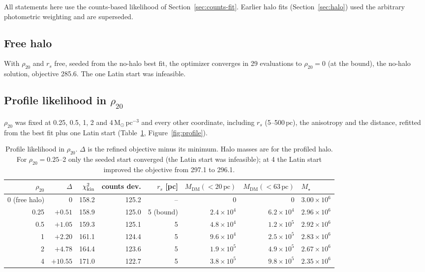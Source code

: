 \documentclass[11pt,a4paper]{article}
\newcommand{\Msun}{\ensuremath{\mathrm{M}_\odot}\xspace}
\newcommand{\pc}{\ensuremath{\,\mathrm{pc}}\xspace}
\newcommand{\dm}{\mathrm{DM}}
\newcommand{\chikin}{\ensuremath{\chi^2_{\rm kin}}\xspace}
\begin{document}
All statements here use the counts-based likelihood of
Section~\ref{sec:counts-fit}. Earlier halo fits (Section~\ref{sec:halo}) used
the arbitrary photometric weighting and are superseded.

\subsection{Free halo}
With $\rho_{20}$ and $r_s$ free, seeded from the no-halo best fit, the
optimizer converges in 29 evaluations to $\rho_{20}=0$ (at the bound), the
no-halo solution, objective 285.6. The one Latin start was infeasible.

\subsection{Profile likelihood in $\rho_{20}$}
\label{sec:profile}

$\rho_{20}$ was fixed at 0.25, 0.5, 1, 2 and 4\,$\Msun\pc^{-3}$ and every
other coordinate, including $r_s$ (5--500\pc), the anisotropy and the
distance, refitted from the best fit plus one Latin start
(Table~\ref{tab:profile}, Figure~\ref{fig:profile}).

\begin{table}[htbp]
\centering\small
\caption{Profile likelihood in $\rho_{20}$. $\Delta$ is the refined objective
minus its minimum. Halo masses are for the profiled halo. For
$\rho_{20}=0.25$--2 only the seeded start converged (the Latin start was
infeasible); at 4 the Latin start improved the objective from 297.1 to 296.1.}
\label{tab:profile}
\begin{tabular}{rrrrrrrl}
\toprule
$\rho_{20}$ & $\Delta$ & $\chikin$ & counts dev. & $r_s$ [pc] & $M_\dm(<20\pc)$ & $M_\dm(<63\pc)$ & $M_\star$\\
\midrule
0 (free halo) & 0 & 158.2 & 125.2 & -- & 0 & 0 & $3.00\times10^6$\\
0.25 & $+0.51$ & 158.9 & 125.0 & 5 (bound) & $2.4\times10^4$ & $6.2\times10^4$ & $2.96\times10^6$\\
0.5 & $+1.05$ & 159.3 & 125.1 & 5 & $4.8\times10^4$ & $1.2\times10^5$ & $2.92\times10^6$\\
1 & $+2.20$ & 161.1 & 124.4 & 5 & $9.6\times10^4$ & $2.5\times10^5$ & $2.83\times10^6$\\
2 & $+4.78$ & 164.4 & 123.6 & 5 & $1.9\times10^5$ & $4.9\times10^5$ & $2.67\times10^6$\\
4 & $+10.55$ & 171.0 & 122.7 & 5 & $3.8\times10^5$ & $9.8\times10^5$ & $2.35\times10^6$\\
\bottomrule
\end{tabular}
\end{table}
\end{document}
